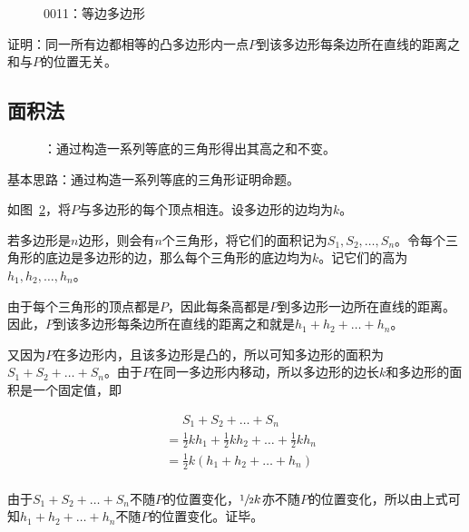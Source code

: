

\begin{figure}[htbp]
  \centering
  \caption{0011：等边多边形} \label{fig:0011}
\end{figure}

证明：同一所有边都相等的凸多边形内一点$P$到该多边形每条边所在直线的距离之和与$P$的位置无关。

\subsection{面积法} \label{subsec:0011-area}

\begin{figure}[htbp]
  \centering
  \caption{：通过构造一系列等底的三角形得出其高之和不变。}
  \label{fig:0011-area}
\end{figure}

基本思路：通过构造一系列等底的三角形证明命题。

如图~\ref{fig:0011-area}，将$P$与多边形的每个顶点相连。设多边形的边均为$k$。

若多边形是$n$边形，则会有$n$个三角形，将它们的面积记为$S_1, S_2, \dots, S_n$。令每个三角形的底边是多边形的边，那么每个三角形的底边均为$k$。记它们的高为$h_1, h_2, \dots, h_n$。

由于每个三角形的顶点都是$P$，因此每条高都是$P$到多边形一边所在直线的距离。因此，$P$到该多边形每条边所在直线的距离之和就是$h_1 + h_2 + \dots + h_n$。

又因为$P$在多边形内，且该多边形是凸的，所以可知多边形的面积为$S_1 + S_2 + \dots + S_n$。由于$P$在同一多边形内移动，所以多边形的边长$k$和多边形的面积是一个固定值，即

\begin{align*}
  &\phantom{=} S_1 + S_2 + \dots + S_n \\
  &= \frac12kh_1 + \frac12kh_2 + \dots + \frac12kh_n \\
  &= \frac12k(h_1 + h_2 + \dots + h_n) \\
\end{align*}

由于$S_1 + S_2 + \dots + S_n$不随$P$的位置变化，$\sfrac12k$亦不随$P$的位置变化，所以由上式可知$h_1 + h_2 + \dots + h_n$不随$P$的位置变化。证毕。
